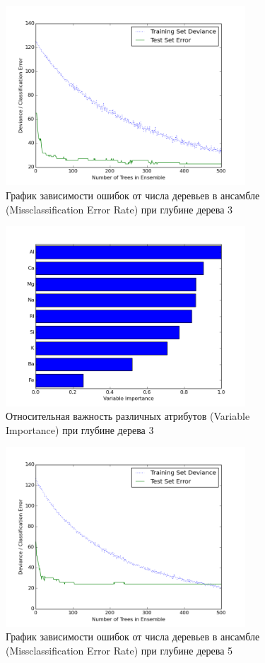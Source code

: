 \documentclass{article} %
\begin{document}
\begin{figure}[H]
    \centering
    \includegraphics[width=0.8\textwidth]{perfGB3depth.png}
    \caption{График зависимости ошибок от числа деревьев в ансамбле
    (Missclassification Error Rate) при глубине дерева 3}
\end{figure}

\begin{figure}[H]
    \centering
    \includegraphics[width=0.8\textwidth]{varImpBG3depth}
    \caption{Относительная важность различных атрибутов
    (Variable Importance) при глубине дерева 3}
\end{figure}

\begin{figure}[H]
    \centering
    \includegraphics[width=0.8\textwidth]{perfGB5depth.png}
    \caption{График зависимости ошибок от числа деревьев в ансамбле
    (Missclassification Error Rate) при глубине дерева 5}
\end{figure}
\end{document}
